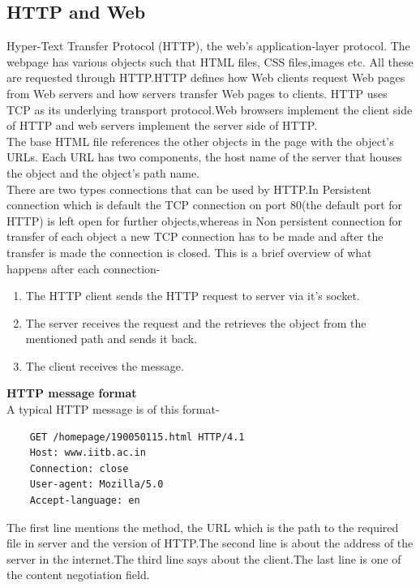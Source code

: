 \documentclass{article}
\begin{document}
\subsection{HTTP and Web}
Hyper-Text Transfer Protocol (HTTP), the web’s application-layer protocol.
The webpage has various objects such that HTML files, CSS files,images etc. All these are requested through HTTP.HTTP defines how Web clients request Web pages from Web servers and how servers transfer Web pages to clients.
HTTP uses TCP as its underlying transport protocol.Web browsers implement the client side of HTTP and web servers implement the server side of HTTP.\\
The base HTML file references the other objects in the page with the object's URLs. Each URL has two components, the host name of the server that houses the object and the object’s path name.\\
There are two types connections that can be used by HTTP.In Persistent connection which is default the TCP connection on port 80(the default port for HTTP) is left open for further objects,whereas in Non persistent connection for transfer of each object a new TCP connection has to be made and after the transfer is made the connection is closed. This is a brief overview of what happens after each connection-
\begin{enumerate}
    \item The HTTP client sends the HTTP request to server via it's socket.
    \item The server receives the request and the retrieves the object from the mentioned path and sends it back.
    \item The client receives the message.
\end{enumerate}
\textbf{HTTP message format}\\
A typical HTTP message is of this format-\\
\begin{center}
    \begin{verbatim}
    GET /homepage/190050115.html HTTP/4.1
    Host: www.iitb.ac.in
    Connection: close 
    User-agent: Mozilla/5.0
    Accept-language: en
    \end{verbatim}
\end{center}
The first line mentions the method, the URL which is the path to the required file in server and the version of HTTP.The second line is about the address of the server in the internet.The third line says about the client.The last line is one of the content negotiation field.
\\
\end{document}
